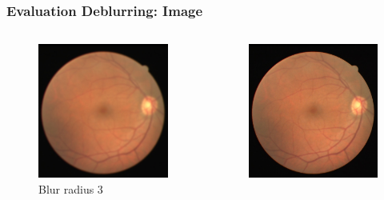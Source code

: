 \documentclass{beamer}
\begin{document}
\begin{frame} \frametitle{Evaluation Deblurring: Image}
  \begin{columns}
  \begin{column}{0.33\linewidth}
      \centering
      \begin{figure}[htb]
        \centering
        \includegraphics[width=1.0\textwidth]{deblur_lr}
        \caption*{Blur radius 3}
      \end{figure}
    \end{column}
  \begin{column}{0.33\linewidth}
      \centering
      \begin{figure}[htb]
        \centering
        \includegraphics[width=1.0\textwidth]{deblur_gan}

\end{figure}
\end{column}
\end{columns}
\end{frame}
\end{document}
